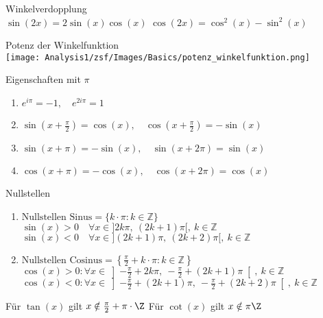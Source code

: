 \begin{corollary}{Winkelverdopplung}\\
        $\sin(2x) = 2 \sin(x)\cos(x)$ \hspace{4mm} $\cos(2x) = \cos^2(x) - \sin^2(x)$
\end{corollary}
\begin{corollary}{Potenz der Winkelfunktion}\\
    \texttt{[image: Analysis1/zsf/Images/Basics/potenz\_winkelfunktion.png]}
\end{corollary}
\begin{corollary}{Eigenschaften mit $\pi$}
    \begin{enumerate}[itemsep= 2pt]
        \item $e^{i\pi} = -1, \quad e^{2i\pi} = 1$
        \item $\sin\left(x + \frac{\pi}{2}\right) = \cos(x), \quad \cos\left(x + \frac{\pi}{2}\right) = -\sin(x)$
        \item $\sin(x+\pi) = -\sin (x), \quad \sin(x + 2\pi) = \sin(x)$
        \item $\cos(x+\pi) = -\cos (x), \quad \cos(x + 2\pi) = \cos(x)$
    \end{enumerate}
\end{corollary}
\begin{corollary}{Nullstellen}
    \begin{enumerate}
         \item $\text{Nullstellen Sinus} = \{k\cdot \pi : k\in \mathbb{Z}\}$\\
        $\sin(x) > 0 \quad \forall x \in ]2k\pi, ~(2k+1)\pi[, ~ k\in \mathbb{Z}$\\[2pt]
        $\sin(x) < 0 \quad \forall x \in ](2k + 1)\pi, ~(2k+2)\pi[, ~ k\in \mathbb{Z}$
        \item $\text{Nullstellen Cosinus} = \left\{\frac{\pi}{2}+k\cdot \pi : k\in \mathbb{Z}\right\}$\\
        $\cos(x) > 0:\forall x \in \left]-\frac{\pi}{2} +2k\pi, ~-\frac{\pi}{2} +(2k+1)\pi\right[, ~ k\in \mathbb{Z}$\\[2pt]
        $\cos(x) < 0:\forall x \in \left]-\frac{\pi}{2} + (2k + 1)\pi, ~-\frac{\pi}{2} +(2k+2)\pi\right[, ~ k\in \mathbb{Z}$
    \end{enumerate}
\end{corollary}
\noindent Für $\tan(x)$ gilt $x \notin \frac{\pi}{2} + \pi \cdot \Z$ \qquad Für $\cot(x)$ gilt $x \notin \pi \Z$


